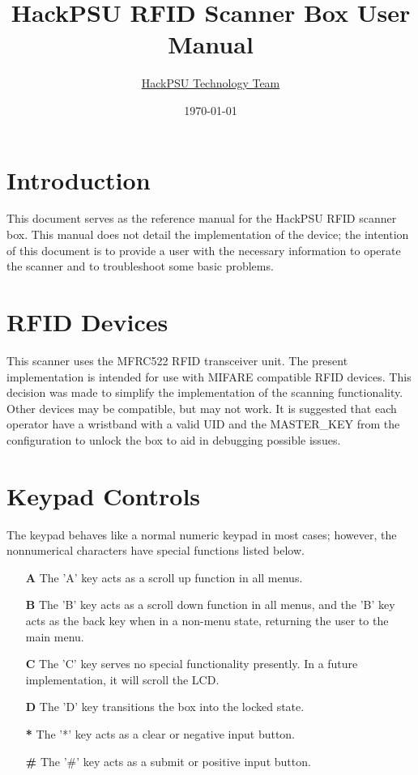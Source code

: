 \documentclass{article}
\title{HackPSU RFID Scanner Box User Manual}
\date{\today}
\author{ \href{mailto:technology@hackpsu.org}{HackPSU Technology Team}}
\begin{document}
\maketitle

\section*{Introduction}
This document serves as the reference manual for the HackPSU RFID scanner box.  This manual does not detail the implementation of the device; the intention of this document is to provide a user with the necessary information to operate the scanner and to troubleshoot some basic problems. 

\tableofcontents

\section{RFID Devices}
This scanner uses the MFRC522 RFID transceiver unit. The present implementation is intended for use with MIFARE compatible RFID devices.  This decision was made to simplify the implementation of the scanning functionality.  Other devices may be compatible, but may not work.  It is suggested that each operator have a wristband with a valid UID and the MASTER\_KEY from the configuration to unlock the box to aid in debugging possible issues.

\section{Keypad Controls}
The keypad behaves like a normal numeric keypad in most cases; however, the nonnumerical characters have special functions listed below.  
\begin{itemize}
	\item[\textbf{A}] The 'A' key acts as a scroll up function in all menus.
	\item[\textbf{B}] The 'B' key acts as a scroll down function in all menus, and the 'B' key acts as the back key when in a non-menu state, returning the user to the main menu.
	\item[\textbf{C}] The 'C' key serves no special functionality presently.  In a future implementation, it will scroll the LCD.
	\item[\textbf{D}] The 'D' key transitions the box into the locked state.
	\item[\textbf{*}] The '*' key acts as a clear or negative input button.  
	\item[\textbf{\#}] The '\#' key acts as a submit or positive input button.
\end{itemize}
\end{document}
